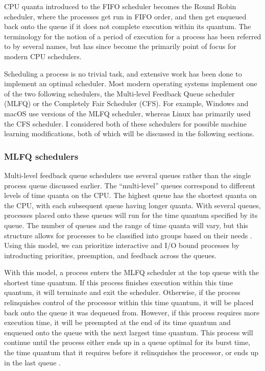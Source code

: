 \documentclass[12pt]{article}
\def\ind{\hspace*{0.3in}}
\begin{document}
CPU quanta introduced to the FIFO scheduler becomes the Round Robin scheduler, where the processes get run in FIFO order, and then get enqueued back onto the queue if it does not complete execution within its quantum. The terminology for the notion of a period of execution for a process has been referred to by several names, but has since become the primarily point of focus for modern CPU schedulers.

Scheduling a process is no trivial task, and extensive work has been done to implement an optimal scheduler. Most modern operating systems implement one of the two following schedulers, the Multi-level Feedback Queue scheduler (MLFQ) or the Completely Fair Scheduler (CFS). For example, Windows and macOS use versions of the MLFQ scheduler, whereas Linux has primarily used the CFS scheduler. I considered both of these schedulers for possible machine learning modifications, both of which will be discussed in the following sections.

\subsubsection*{MLFQ schedulers}

\ind Multi-level feedback queue schedulers use several queues rather than the single process queue discussed earlier. The ``multi-level'' queues correspond to different levels of time quanta on the CPU. The highest queue has the shortest quanta on the CPU, with each subsequent queue having longer quanta. With several queues, processes placed onto these queues will run for the time quantum specified by its queue. The number of queues and the range of time quanta will vary, but this structure allows for processes to be classified into groups based on their needs \cite{MultilevelQueue2018}. Using this model, we can prioritize interactive and I/O bound processes by introducting priorities, preemption, and feedback across the queues.

With this model, a process enters the MLFQ scheduler at the top queue with the shortest time quantum. If this process finishes execution within this time quantum, it will terminate and exit the scheduler. Otherwise, if the process relinquishes control of the processor within this time quantum, it will be placed back onto the queue it was dequeued from. However, if this process requires more execution time, it will be preempted at the end of its time quantum and enqueued onto the queue with the next largest time quantum. This process will continue until the process either ends up in a queue optimal for its burst time, the time quantum that it requires before it relinquishes the processor, or ends up in the last queue \cite{MultilevelFeedbackQueue2020,DifferenceMultilevelQueue2020}.
\end{document}
